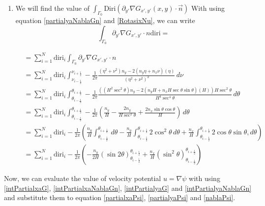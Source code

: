 \documentclass[a4paper,12pt]{article}
\newcommand{\integ}[3]{%
\ensuremath{\displaystyle{\int^{#2}_{#1} #3}}}
\begin{document}
\begin{enumerate}
\item We will find the value of $\integ{\Gamma_0}{}{\text{Diri}\left(\partial_{y'}\nabla G_{x',y'}(x,y)\cdot \vec{n}\right)}$
With using equation \ref{partialyaNablaGn} and \ref{RotasixNu}, we can write
\[
  \integ{\Gamma_0}{}{\partial_{y'}\nabla G_{x',y'} \cdot n \text{diri}}=
\]

\begin{align}
&=\sum\limits_{i=1}^N \text{diri}_i \integ{\Gamma_0}{}{\partial_{y'}\nabla G_{x',y'} \cdot n}\\
&=\sum\limits_{i=1}^N \text{diri}_i \integ{\nu_{i-\frac{1}{2}}}{\nu_{i+\frac{1}{2}}}{-\frac{1}{2\pi} \frac{(\eta^2+\nu^2)n_y-2(n_y\eta+n_x\nu)(\eta)}{(\eta^2+\nu^2)^2} \, d\nu}\\
&=\sum\limits_{i=1}^N \text{diri}_i \integ{\theta_{i-\frac{1}{2}}}{\theta_{i+\frac{1}{2}}}{-\frac{1}{2\pi} \frac{\left((H^2 \sec^2\theta)n_y-2(n_y H+n_x H \sec \theta \sin \theta)(H)\right)H \sec^2\theta}{H^4 \sec^4\theta} \, d\theta}\\
&=\sum\limits_{i=1}^N \text{diri}_i \integ{\theta_{i-\frac{1}{2}}}{\theta_{i+\frac{1}{2}}}{-\frac{1}{2\pi} \left( \frac{n_y}{H}-\frac{2n_y}{H \sec^2\theta}+\frac{2n_x \sin \theta \cos\theta}{H} \right) \, d\theta}\\
&=\sum\limits_{i=1}^N \text{diri}_i -\frac{1}{2\pi} \left(\frac{n_y}{H} \integ{\theta_{i-\frac{1}{2}}}{\theta_{i+\frac{1}{2}}}{\, d\theta}-
 \frac{n_y}{H} \integ{\theta_{i-\frac{1}{2}}}{\theta_{i+\frac{1}{2}}}{2\cos^2\theta \, d\theta}+
 \frac{n_x}{H} \integ{\theta_{i-\frac{1}{2}}}{\theta_{i+\frac{1}{2}}}{2\cos \theta \sin\theta, d\theta} \right)\\
&=\sum\limits_{i=1}^N \text{diri}_i -\frac{1}{2\pi} \left(-\frac{n_y}{2H}\left(\sin2\theta\right)_{\theta_{i-\frac{1}{2}}}^{\theta_{i+\frac{1}{2}}}+\frac{n_x}{H}(\sin^2\theta)_{\theta_{i-\frac{1}{2}}}^{\theta_{i+\frac{1}{2}}}\right)\label{intPartialyaNablaGn}
\end{align}

\end{enumerate}

Now, we can evaluate the value of velocity potential $u=\nabla\psi$ with using \ref{intPartialxaG}, \ref{intPartialxaNablaGn}, \ref{intPartialyaG} and \ref{intPartialyaNablaGn} and substitute them to equation
\ref{partialxaPsi}, \ref{partialyaPsi} and \ref{nablaPsi}.
\end{document}
